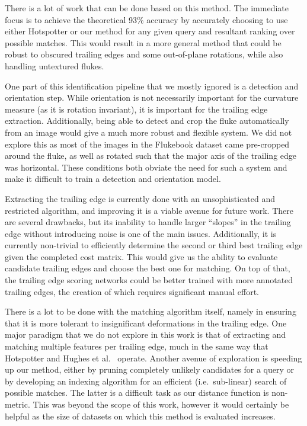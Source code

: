 There is a lot of work that can be done based on this method.
The immediate focus is to achieve the theoretical 93\% accuracy by accurately choosing to use either Hotspotter or our method for any given query and resultant ranking over possible matches.
This would result in a more general method that could be robust to obscured trailing edges and some out-of-plane rotations, while also handling untextured flukes.

One part of this identification pipeline that we mostly ignored is a detection and orientation step.
While orientation is not necessarily important for the curvature measure (as it is rotation invariant), it is important for the trailing edge extraction.
Additionally, being able to detect and crop the fluke automatically from an image would give a much more robust and flexible system.
We did not explore this as most of the images in the Flukebook dataset came pre-cropped around the fluke, as well as rotated such that the major axis of the trailing edge was horizontal.
These conditions both obviate the need for such a system and make it difficult to train a detection and orientation model.

Extracting the trailing edge is currently done with an unsophisticated and restricted algorithm, and improving it is a viable avenue for future work. 
There are several drawbacks, but its inability to handle larger ``slopes'' in the trailing edge without introducing noise is one of the main issues.
Additionally, it is currently non-trivial to efficiently determine the second or third best trailing edge given the completed cost matrix.
This would give us the ability to evaluate candidate trailing edges and choose the best one for matching.
On top of that, the trailing edge scoring networks could be better trained with more annotated trailing edges, the creation of which requires significant manual effort.

There is a lot to be done with the matching algorithm itself, namely in ensuring that it is more tolerant to insignificant deformations in the trailing edge.
One major paradigm that we do not explore in this work is that of extracting and matching multiple features per trailing edge, much in the same way that Hotspotter and Hughes et al.\ \cite{hughes2015automated} operate.
Another avenue of exploration is speeding up our method, either by pruning completely unlikely candidates for a query or by developing an indexing algorithm for an efficient (i.e.\ sub-linear) search of possible matches.
The latter is a difficult task as our distance function is non-metric.
This was beyond the scope of this work, however it would certainly be helpful as the size of datasets on which this method is evaluated increases.

